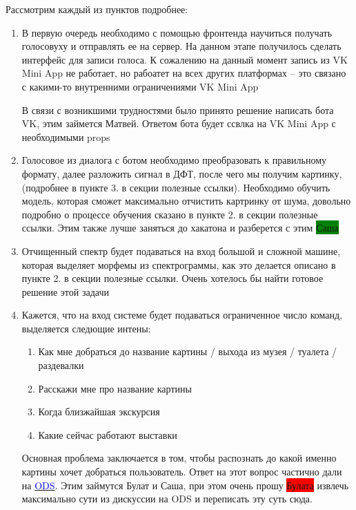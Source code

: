 \documentclass[11pt]{article}
\begin{document}
Рассмотрим каждый из пунктов подробнее:
\begin{enumerate}
\item В первую очередь необходимо с помощью фронтенда научиться получать голосовуху и отправлять ее на сервер. На данном этапе получилось сделать интерфейс для записи голоса. К сожалению на данный момент запись из VK Mini App не работает, но рабоатет на всех других платформах -- это связано с какими-то внутренними ограничениями VK Mini App

В связи с возникшими трудностями было принято решение написать бота VK, этим займется Матвей.  Ответом бота будет ссвлка на VK Mini App с необходимыми props

\item Голосовое из диалога с ботом необходимо преобразовать к правильному формату, далее разложить сигнал в ДФТ, после чего мы получим картинку, (подробнее в пункте 3. в секции полезные ссылки). Необходимо обучить модель, которая сможет максимально отчистить картринку от шума, довольно подробно о процессе обучения сказано в пункте 2. в секции полезные ссылки. Этим также лучше заняться до хакатона и разберется с этим  \colorbox{green}{Саша}

\item Отчищенный спектр будет подаваться на вход большой и сложной машине, которая выделяет морфемы из спектрограммы, как это делается описано в пункте 2. в секции полезные ссылки. Очень хотелось бы найти готовое решение этой задачи

\item Кажется, что на вход системе будет подаваться ограниченное число команд, выделяется следющие интены:\begin{enumerate}
\item Как мне добраться до название картины / выхода из музея / туалета / раздевалки
\item Расскажи мне про название картины
\item Когда близжайшая экскурсия
\item Какие сейчас работают выставки 
\end{enumerate}

Основная проблема заключается в том, чтобы распознать до какой именно картины хочет добраться пользователь. Ответ на этот вопрос частично дали на \href{https://opendatascience.slack.com/archives/C04N3UMSL/p1568308189002800}{\textcolor{blue}{ODS}}. Этим займутся Булат и Саша, при этом очень прошу \colorbox{red}{Булата} извлечь максимально сути из дискуссии на ODS и переписать эту суть сюда.


\end{enumerate}
\end{document}
